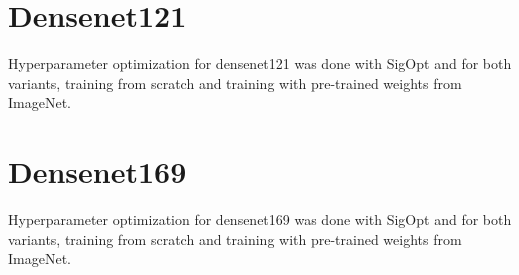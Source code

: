 \section{Densenet121}

Hyperparameter optimization for densenet121 was done with SigOpt and for both variants, training from scratch and training with pre-trained weights from ImageNet.

\begin{table}[h] \centering
{}
\caption{Hyper parameters for densenet121 optimized with SigOpt. First row shows hyperparameters training the architecture from scratch. Second row used pre-trained weights from ImageNet}
\label{tbl:Densenet121}
\end{table}










\section{Densenet169}

Hyperparameter optimization for densenet169 was done with SigOpt and for both variants, training from scratch and training with pre-trained weights from ImageNet.

\begin{table}[h] \centering
{}
\caption{Hyper parameters for densenet121 optimized with SigOpt. First row shows hyperparameters training the architecture from scratch. Second row used pre-trained weights from ImageNet}
\label{tbl:Densenet169}
\end{table}




